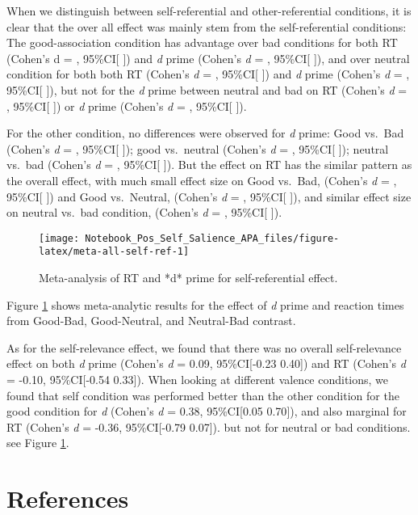 \documentclass[
  man]{apa6}
\begin{document}
When we distinguish between self-referential and other-referential conditions, it is clear that the over all effect was mainly stem from the self-referential conditions: The good-association condition has advantage over bad conditions for both RT (Cohen's d = , 95\%CI{[} {]}) and \emph{d} prime (Cohen's \emph{d} = , 95\%CI{[} {]}), and over neutral condition for both both RT (Cohen's \emph{d} = , 95\%CI{[} {]}) and \emph{d} prime (Cohen's \emph{d} = , 95\%CI{[} {]}), but not for the \emph{d} prime between neutral and bad on RT (Cohen's \emph{d} = , 95\%CI{[} {]}) or \emph{d} prime (Cohen's \emph{d} = , 95\%CI{[} {]}).

For the other condition, no differences were observed for \emph{d} prime: Good vs.~Bad (Cohen's \emph{d} = , 95\%CI{[} {]}); good vs.~neutral (Cohen's \emph{d} = , 95\%CI{[} {]}); neutral vs.~bad (Cohen's \emph{d} = , 95\%CI{[} {]}). But the effect on RT has the similar pattern as the overall effect, with much small effect size on Good vs.~Bad, (Cohen's \emph{d} = , 95\%CI{[} {]}) and Good vs.~Neutral, (Cohen's \emph{d} = , 95\%CI{[} {]}), and similar effect size on neutral vs.~bad condition, (Cohen's \emph{d} = , 95\%CI{[} {]}).

\begin{figure}

{\centering \texttt{[image: Notebook\_Pos\_Self\_Salience\_APA\_files/figure-latex/meta-all-self-ref-1]} 

}

\caption{Meta-analysis of RT and *d* prime for self-referential effect.}\label{fig:meta-all-self-ref}
\end{figure}

Figure \ref{fig:meta-all-self-ref} shows meta-analytic results for the effect of \emph{d} prime and reaction times from Good-Bad, Good-Neutral, and Neutral-Bad contrast.

As for the self-relevance effect, we found that there was no overall self-relevance effect on both \emph{d} prime (Cohen's \emph{d} = 0.09, 95\%CI{[}-0.23 0.40{]}) and RT (Cohen's \emph{d} = -0.10, 95\%CI{[}-0.54 0.33{]}). When looking at different valence conditions, we found that self condition was performed better than the other condition for the good condition for \emph{d} (Cohen's \emph{d} = 0.38, 95\%CI{[}0.05 0.70{]}), and also marginal for RT (Cohen's \emph{d} = -0.36, 95\%CI{[}-0.79 0.07{]}). but not for neutral or bad conditions. see Figure \ref{fig:meta-all-self-ref}.

\hypertarget{references}{%
\section{References}\label{references}}
\end{document}
